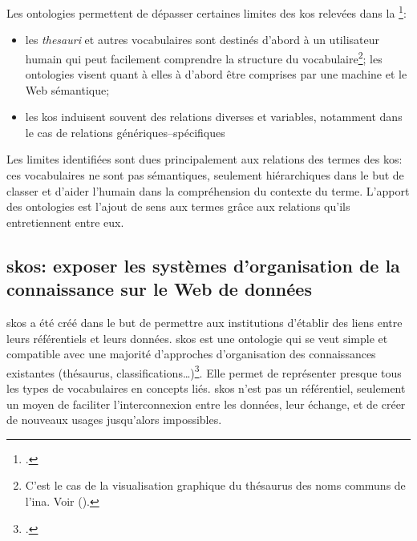 Les ontologies permettent de dépasser certaines limites des \ac{kos} relevées dans la \footcite{isaac_les_2012}:
\begin{itemize}
	\item les \textit{thesauri} et autres vocabulaires sont destinés d'abord à un utilisateur humain qui peut facilement comprendre la structure du vocabulaire\footnote{C'est le cas de la visualisation graphique du thésaurus des noms communs de l'\ac{ina}. Voir  ().}; les ontologies visent quant à elles à d'abord être comprises par une machine et le Web sémantique;
	\item les \ac{kos} induisent souvent des relations diverses et variables, notamment dans le cas de relations génériques--spécifiques
\end{itemize}
\medskip
Les limites identifiées sont dues principalement aux relations des termes des \ac{kos}: ces vocabulaires ne sont pas sémantiques, seulement hiérarchiques dans le but de classer et d'aider l'humain dans la compréhension du contexte du terme. L'apport des ontologies est l'ajout de sens aux termes grâce aux relations qu'ils entretiennent entre eux.


\subsection{\label{II-B-2-b}\ac{skos}: exposer les systèmes d'organisation de la connaissance sur le Web de données}

\ac{skos} a été créé dans le but de permettre aux institutions d'établir des liens entre leurs référentiels et leurs données. \ac{skos} est \og une ontologie qui se veut simple et compatible avec une majorité d’approches d’organisation des connaissances existantes (thésaurus, classifications\dots)\fg{}\footcite[p.8]{isaac_les_2012}. Elle permet de représenter presque tous les types de vocabulaires en concepts liés. \ac{skos} n'est pas un référentiel, seulement un moyen de faciliter l'interconnexion entre les données, leur échange, et de créer de nouveaux usages jusqu'alors impossibles.\\

